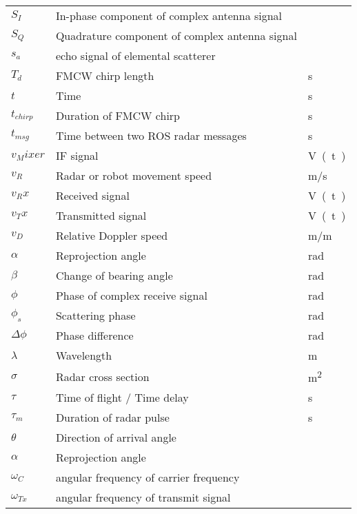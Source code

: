 \begin{listofsymbols}
\begin{tabularx}{\textwidth}{%
  >{\setlength{\hsize}{3cm}\raggedright\arraybackslash}X%
  X%
  >{\setlength{\hsize}{2cm}\raggedright\arraybackslash}X%
}
$S_I$ & In-phase component of complex antenna signal & \\
$S_Q$ & Quadrature component of complex antenna signal & \\
$s_a$ & echo signal of elemental scatterer  & \\
$T_d$ & FMCW chirp length                   & \si{s} \\
$t$ & Time                                  & \si{s} \\
$t_{chirp}$ & Duration of FMCW chirp        & \si{s} \\
$t_{msg}$ & Time between two ROS radar messages & \si{s} \\
$v_Mixer$ & IF signal                       & \si{V(t)} \\
$v_R$ & Radar or robot movement speed       & \si{m/s} \\
$v_Rx$ & Received signal                    & \si{V(t)} \\
$v_Tx$ & Transmitted signal                 & \si{V(t)} \\
$v_D$ & Relative Doppler speed              & \si{m/m} \\
$\alpha$ & Reprojection angle               & \si{rad}\\
$\beta$ & Change of bearing angle               & \si{rad}\\
$\phi$ & Phase of complex receive signal    & \si{rad}\\
$\phi_s$ & Scattering phase    & \si{rad}\\
$\Delta\phi$ & Phase difference             & \si{rad}\\
$\lambda$ & Wavelength                      & \si{m} \\
$\sigma$ & Radar cross section              & \si{m^2} \\
$\tau$ & Time of flight / Time delay        & \si{s} \\
$\tau_m$ & Duration of radar pulse        & \si{s} \\
$\theta$ & Direction of arrival angle        & \\
$\alpha$ & Reprojection angle               &\\
$\omega_C$ & angular frequency of carrier frequency &\\
$\omega_{Tx}$ & angular frequency of transmit signal &\\

\end{tabularx}


\end{listofsymbols}
